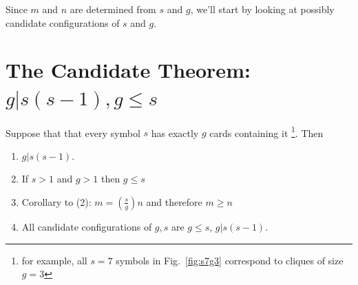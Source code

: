 \documentclass[11pt, oneside]{article} 	%
\begin{document}
Since $m$ and $n$ are determined from $s$ and $g$, we'll start by looking at possibly candidate configurations of $s$ and $g$.

\section{The Candidate Theorem: $g | s(s-1), g \leq s$}

Suppose that that every symbol $s$ has exactly $g$ cards containing it \footnote{for example, all $s=7$ symbols in Fig.~\ref{fig:s7g3} correspond to cliques of size $g=3$}. Then 

\begin{framed}
\begin{enumerate}
\item $g | s(s-1)$.
\item If $s >1 $ and $g > 1$ then $g \leq s$ 
\item Corollary to (2): $m = (\frac{s}{g})n$ and therefore $m \geq n$
\item All candidate configurations of $g, s$ are $g \leq s$, $g | s(s-1)$.
\end{enumerate}
\end{framed}
\end{document}
